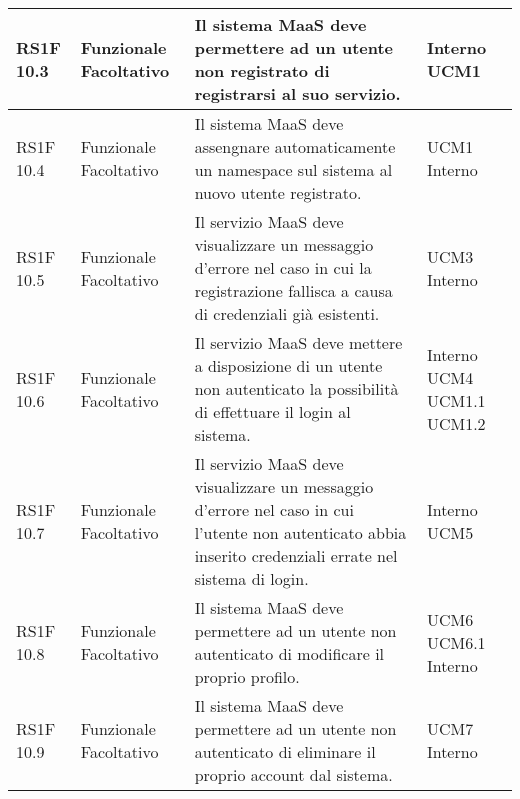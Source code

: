 \begin{center}
\begin{longtable}{ | l | p{2cm} | p{5cm} | p{1.7cm} |}
        RS1F 10.3 & Funzionale \newline  Facoltativo  & Il sistema MaaS deve permettere ad un utente non registrato di registrarsi al suo servizio. &  Interno \newline  UCM1 \newline  \\ \hline      
        RS1F 10.4 & Funzionale \newline  Facoltativo  & Il sistema MaaS deve assengnare automaticamente un namespace sul sistema al nuovo utente registrato. &  UCM1 \newline  Interno \newline  \\ \hline      
        RS1F 10.5 & Funzionale \newline  Facoltativo  & Il servizio MaaS deve visualizzare un messaggio d'errore nel caso in cui la registrazione fallisca a causa di credenziali già esistenti. &  UCM3 \newline  Interno \newline  \\ \hline      
        RS1F 10.6 & Funzionale \newline  Facoltativo  & Il servizio MaaS deve mettere a disposizione di un utente non autenticato la possibilità di effettuare il login al sistema. &  Interno \newline  UCM4 \newline  UCM1.1 \newline  UCM1.2 \newline  \\ \hline      
        RS1F 10.7 & Funzionale \newline  Facoltativo  & Il servizio MaaS deve visualizzare un messaggio d'errore nel caso in cui l'utente non autenticato abbia inserito credenziali errate nel sistema di login. &  Interno \newline  UCM5 \newline  \\ \hline      
        RS1F 10.8 & Funzionale \newline  Facoltativo  & Il sistema MaaS deve permettere ad un utente non autenticato di modificare il proprio profilo. &  UCM6 \newline  UCM6.1 \newline  Interno \newline  \\ \hline      
        RS1F 10.9 & Funzionale \newline  Facoltativo  & Il sistema MaaS deve permettere ad un utente non autenticato di eliminare il proprio account dal sistema. &  UCM7 \newline  Interno \newline  \\ \hline
      \end{longtable}
      \egroup
      \end{center}  
\clearpage


